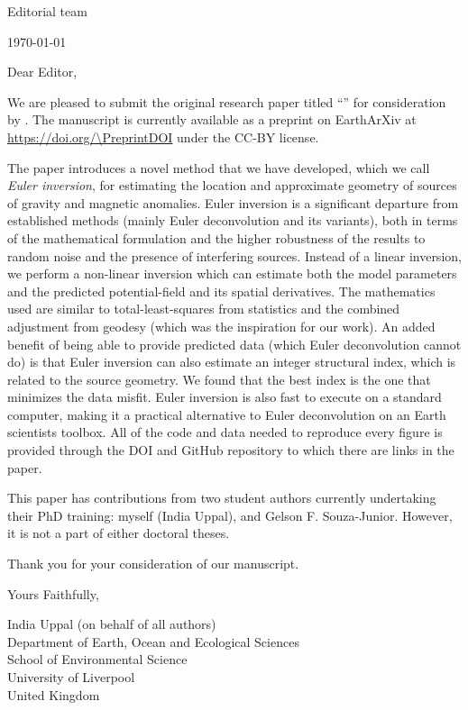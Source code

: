 \documentclass[a4paper,onecolumn,10pt]{article}
\newcommand{\Padding}{\vspace{0.75cm}}
\begin{document}
\begin{flushleft}
    Editorial team
    \\
    \Journal
\end{flushleft}
\begin{flushright}
  \today
\end{flushright}
\Padding

\noindent
Dear Editor,
\Padding

We are pleased to submit the original research paper titled ``\Title{}'' for
consideration by \Journal{}.
The manuscript is currently available as a preprint on EarthArXiv at \url{https://doi.org/\PreprintDOI} under the CC-BY license. 

The paper introduces a novel method that we have developed, which we call
\textit{Euler inversion}, for estimating the location and approximate geometry
of sources of gravity and magnetic anomalies.
Euler inversion is a significant departure from established methods (mainly
Euler deconvolution and its variants), both in terms of the mathematical
formulation and the higher robustness of the results to random noise and the
presence of interfering sources.
Instead of a linear inversion, we perform a non-linear inversion which can
estimate both the model parameters and the predicted potential-field and its
spatial derivatives.
The mathematics used are similar to total-least-squares from statistics and the
combined adjustment from geodesy (which was the inspiration for our work).
An added benefit of being able to provide predicted data (which Euler
deconvolution cannot do) is that Euler inversion can also estimate an integer
structural index, which is related to the source geometry.
We found that the best index is the one that minimizes the data misfit.
Euler inversion is also fast to execute on a standard computer, making it
a practical alternative to Euler deconvolution on an Earth scientists toolbox.
All of the code and data needed to reproduce every figure is provided through
the DOI and GitHub repository to which there are links in the paper.

This paper has contributions from two student authors currently undertaking their PhD training: myself (India Uppal), and Gelson F. Souza-Junior. 
However, it is not a part of either doctoral theses. 
\Padding

Thank you for your consideration of our manuscript.
\Padding

\begin{flushleft}
  Yours Faithfully,
  \Padding

  India Uppal (on behalf of all authors)
  \\[0.25cm]
  {
    \color{mediumgray}
    \small
    Department of Earth, Ocean and Ecological Sciences
    \\
    School of Environmental Science
    \\
    University of Liverpool
    \\
    United Kingdom
  }
\end{flushleft}
\end{document}
